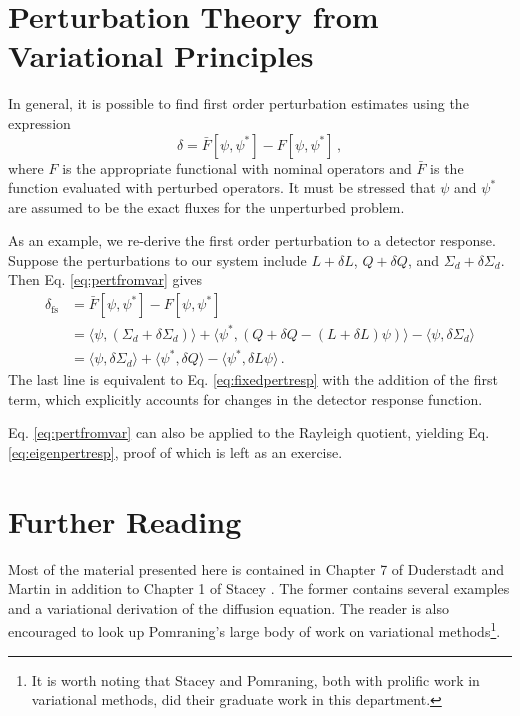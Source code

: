 \section*{Perturbation Theory from Variational Principles}

In general, it is possible to find first order perturbation estimates using 
the expression
\begin{equation}
 \delta = \bar{F}[\psi,\psi^*] - F[\psi,\psi^*] \, ,
 \label{eq:pertfromvar}
\end{equation}
where $F$ is the appropriate functional with nominal operators 
and $\bar{F}$ is the function evaluated with perturbed operators.  It must 
be stressed that $\psi$ and $\psi^*$ are assumed to be the exact fluxes for 
the unperturbed problem.

As an example, we re-derive the first order perturbation to a detector 
response.  Suppose the perturbations to our system 
include $L+\delta L$, $Q+\delta Q$, 
and $\Sigma_d + \delta \Sigma_d$.  Then Eq. \ref{eq:pertfromvar}  gives
\begin{equation}
\begin{split}
 \delta_{\text{fs}} &= \bar{F}[\psi,\psi^*] - F[\psi,\psi^*] \\
        &= \langle \psi, (\Sigma_d+\delta \Sigma_d) \rangle + 
           \langle \psi^*,(Q+\delta Q-(L+\delta L)\psi ) \rangle - 
           \langle \psi, \delta \Sigma_d \rangle \\
        &= \langle \psi,\delta \Sigma_d \rangle + 
           \langle \psi^* , \delta Q \rangle - 
           \langle \psi^*,\delta L \psi \rangle \, .
\end{split}
\label{eq:fixedpertvar}
\end{equation}
The last line is equivalent to Eq. \ref{eq:fixedpertresp} with the addition 
of the first term, which explicitly accounts for changes in the detector 
response function.

Eq. \ref{eq:pertfromvar} can also be applied to the Rayleigh quotient, 
yielding Eq. \ref{eq:eigenpertresp}, proof of which is left 
as an exercise.

\section*{Further Reading}

Most of the material presented here is contained in Chapter 7 of 
Duderstadt and Martin \cite{duderstadt1976tt}  in addition to Chapter 1 
of Stacey \cite{stacey1974vmn}.  The former contains several examples 
and a variational derivation of the diffusion equation.  The reader is 
also encouraged to look up Pomraning's large body of work on variational 
methods\footnote{It is worth noting that Stacey and Pomraning, both with 
prolific work in variational methods, did their graduate work in 
this department.}.

